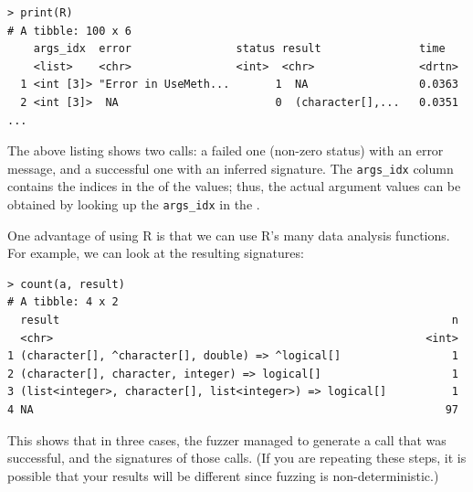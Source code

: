 \documentclass[sigplan,nonacm,anonymous,review]{acmart}
\begin{document}
\begin{lstlisting}
> print(R)
# A tibble: 100 x 6
    args_idx  error                status result               time
    <list>    <chr>                <int>  <chr>                <drtn>
  1 <int [3]> "Error in UseMeth...       1  NA                 0.0363
  2 <int [3]>  NA                        0  (character[],...   0.0351
...
\end{lstlisting}

The above listing shows two calls: a failed one (non-zero status) with an error message, and a successful one with an inferred signature.
The \texttt{args\_idx} column contains the indices in the \sxpdb of the values; thus, the actual argument values can be obtained by looking up the {\tt args\_idx} in the \sxpdb.

One advantage of using R is that we can use R's many data analysis functions.
For example, we can look at the resulting signatures:

\begin{lstlisting}
> count(a, result)
# A tibble: 4 x 2
  result                                                            n
  <chr>                                                         <int>
1 (character[], ^character[], double) => ^logical[]                 1
2 (character[], character, integer) => logical[]                    1
3 (list<integer>, character[], list<integer>) => logical[]          1
4 NA                                                               97
\end{lstlisting}

This shows that in three cases, the fuzzer managed to generate a call that was successful, and the signatures of those calls.
(If you are repeating these steps, it is possible that your results will be different since fuzzing is non-deterministic.)
\end{document}
